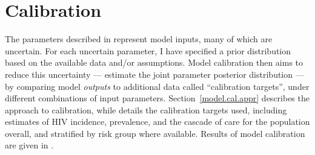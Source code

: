 \section{Calibration}\label{model.cal}
The parameters described in  represent model inputs, many of which are uncertain.
For each uncertain parameter, I have specified a prior distribution based on
the available data and/or assumptions.
Model calibration then aims to reduce this uncertainty
--- \ie estimate the joint parameter posterior distribution ---
by comparing model \emph{outputs} to additional data called ``calibration targets'',
under different combinations of input parameters.
Section~\ref{model.cal.appr} describes the approach to calibration, while
 details the calibration targets used,
including estimates of HIV incidence, prevalence, and the cascade of care
for the population overall, and stratified by risk group where available.
Results of model calibration are given in .

